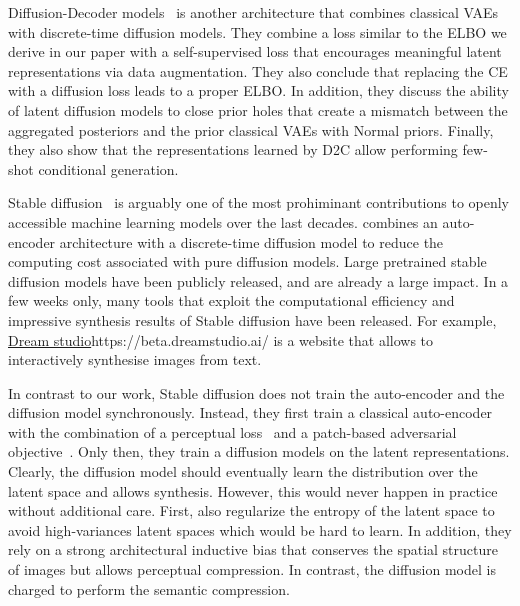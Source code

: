 Diffusion-Decoder models~\citep[][D2C]{sinha2021d2c} is another architecture that combines classical VAEs with discrete-time diffusion models. They combine a loss similar to the ELBO we derive in our paper with a self-supervised loss that encourages meaningful latent representations via data augmentation. They also conclude that replacing the CE with a diffusion loss leads to a proper ELBO. In addition, they discuss the ability of latent diffusion models to close prior holes that create a mismatch between the aggregated posteriors and the prior classical VAEs with Normal priors. Finally, they also show that the representations learned by D2C allow performing few-shot conditional generation.

Stable diffusion~\citep{rombach2022high} is arguably one of the most prohiminant contributions to openly accessible machine learning models over the last decades. \citet{rombach2022high} combines an auto-encoder architecture with a discrete-time diffusion model to reduce the computing cost associated with pure diffusion models. Large pretrained stable diffusion models have been publicly released, and are already a large impact. In a few weeks only, many tools that exploit the computational efficiency and impressive synthesis results of Stable diffusion have been released. For example, \url{Dream studio}{https://beta.dreamstudio.ai/} is a website that allows to interactively synthesise images from text.

In contrast to our work, Stable diffusion does not train the auto-encoder and the diffusion model synchronously. Instead, they first train a classical auto-encoder with the combination of a perceptual loss~\citep{zhang2018unreasonable} and a patch-based adversarial objective~\citep{dosovitskiy2016generating, esser2021taming, yu2021vector}. Only then, they train a diffusion models on the latent representations. Clearly, the diffusion model should eventually learn the distribution over the latent space and allows synthesis. However, this would never happen in practice without additional care. First, \citet{rombach2022high} also regularize the entropy of the latent space to avoid high-variances latent spaces which would be hard to learn. In addition, they rely on a strong architectural inductive bias that conserves the spatial structure of images but allows perceptual compression. In contrast, the diffusion model is charged to perform the semantic compression.


